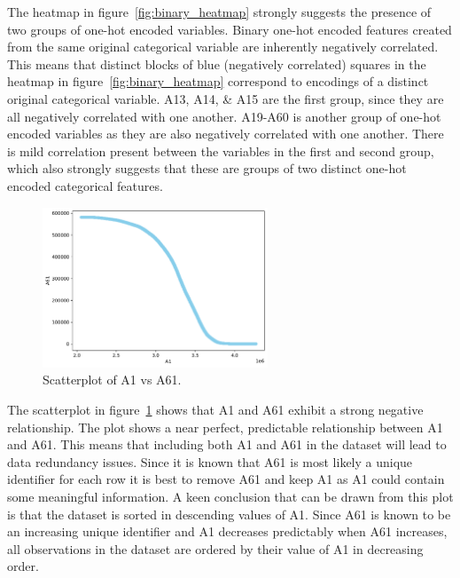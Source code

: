 \documentclass[11pt]{report}
\begin{document}
The heatmap in figure~\ref{fig:binary_heatmap} strongly suggests the presence of two groups of one-hot encoded variables. Binary one-hot encoded features created from the same original categorical variable are inherently negatively correlated. This means that distinct blocks of blue (negatively correlated) squares in the heatmap in figure~\ref{fig:binary_heatmap} correspond to encodings of a distinct original categorical variable. A13, A14, \& A15 are the first group, since they are all negatively correlated with one another. A19-A60 is another group of one-hot encoded variables as they are also negatively correlated with one another. There is mild correlation present between the variables in the first and second group, which also strongly suggests that these are groups of two distinct one-hot encoded categorical features.

\begin{figure}[H]
    \centering
    \includegraphics[width=0.6\textwidth]{images/A1_vs_A61_scatterplot.pdf}
    \caption{Scatterplot of A1 vs A61.}
    \label{fig:A1_vs_A61_scatterplot}
\end{figure}

The scatterplot in figure~\ref{fig:A1_vs_A61_scatterplot} shows that A1 and A61 exhibit a strong negative relationship. The plot shows a near perfect, predictable relationship between A1 and A61. This means that including both A1 and A61 in the dataset will lead to data redundancy issues. Since it is known that A61 is most likely a unique identifier for each row it is best to remove A61 and keep A1 as A1 could contain some meaningful information. A keen conclusion that can be drawn from this plot is that the dataset is sorted in descending values of A1. Since A61 is known to be an increasing unique identifier and A1 decreases predictably when A61 increases, all observations in the dataset are ordered by their value of A1 in decreasing order.
\end{document}
